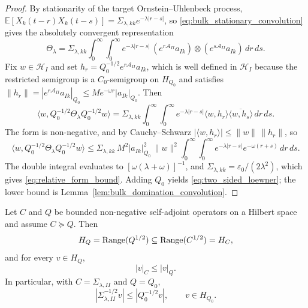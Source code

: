 \begin{proof}
By stationarity of the target Ornstein--Uhlenbeck process,
$\mathbb{E}[X_k(t-r)X_k(t-s)]=\Sigma_{\lambda,kk}e^{-\lambda|r-s|}$, so
\eqref{eq:bulk_stationary_convolution} gives the absolutely convergent
representation
\[
  \Theta_\lambda
  =\Sigma_{\lambda,kk}
   \int_0^\infty\!\!\int_0^\infty
   e^{-\lambda|r-s|}\,
   (e^{r\mathcal{A}_{II}}a_{Ik})\otimes(e^{s\mathcal{A}_{II}}a_{Ik})
   \,dr\,ds .
\]
Fix $w\in\mathcal{H}_I$ and set $h_r=Q_0^{-1/2}e^{r\mathcal{A}_{II}}a_{Ik}$,
which is well defined in $\mathcal{H}_I$ because the restricted semigroup is a
$C_0$-semigroup on $H_{Q_0}$ and satisfies
$\|h_r\|=|e^{r\mathcal{A}_{II}}a_{Ik}|_{Q_0}\le Me^{-\omega r}|a_{Ik}|_{Q_0}$.
Then
\[
  \langle w,Q_0^{-1/2}\Theta_\lambda Q_0^{-1/2}w\rangle
  =\Sigma_{\lambda,kk}
   \int_0^\infty\!\!\int_0^\infty
   e^{-\lambda|r-s|}
   \langle w,h_r\rangle\overline{\langle w,h_s\rangle}\,dr\,ds .
\]
The form is non-negative, and by Cauchy--Schwarz
$|\langle w,h_r\rangle|\le\|w\|\,\|h_r\|$, so
\[
  \langle w,Q_0^{-1/2}\Theta_\lambda Q_0^{-1/2}w\rangle
  \le \Sigma_{\lambda,kk}\,M^2|a_{Ik}|_{Q_0}^2\,\|w\|^2
      \int_0^\infty\!\!\int_0^\infty e^{-\lambda|r-s|}e^{-\omega(r+s)}\,dr\,ds .
\]
The double integral evaluates to $[\omega(\lambda+\omega)]^{-1}$, and
$\Sigma_{\lambda,kk}=\varepsilon_0/(2\lambda^2)$, which gives
\eqref{eq:relative_form_bound}.  Adding $Q_0$ yields
\eqref{eq:two_sided_loewner}; the lower bound is
Lemma~\ref{lem:bulk_domination_convolution}.
\end{proof}

\begin{lemma}
\label{lem:form_domain_energy_domination}
Let $C$ and $Q$ be bounded non-negative self-adjoint operators on a Hilbert
space and assume $C\succeq Q$.  Then
\begin{equation}
  H_Q=\operatorname{Range}(Q^{1/2})\subseteq \operatorname{Range}(C^{1/2})=H_C,
  \label{eq:range_inclusion_CQ}
\end{equation}
and for every $v\in H_Q$,
\begin{equation}
  |v|_C\le |v|_Q.
  \label{eq:energy_domination_CQ}
\end{equation}
In particular, with $C=\Sigma_{\lambda,II}$ and $Q=Q_0$,
\begin{equation}
  |\Sigma_{\lambda,II}^{-1/2}v|
  \le |Q_0^{-1/2}v|,
  \qquad v\in H_{Q_0}.
  \label{eq:Sigma_energy_dominated_by_Q0}
\end{equation}
\end{lemma}

